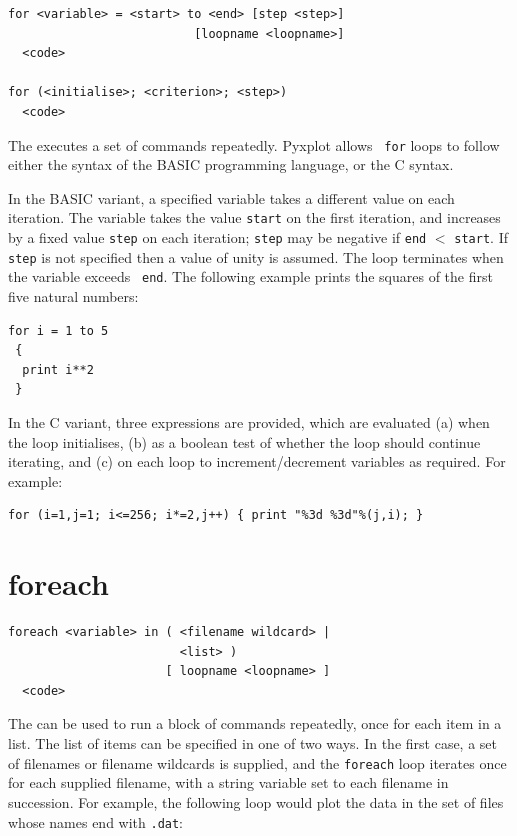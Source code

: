 \begin{verbatim}
for <variable> = <start> to <end> [step <step>]
                          [loopname <loopname>]
  <code>

for (<initialise>; <criterion>; <step>)
  <code>
\end{verbatim}

The  executes a set of commands repeatedly.  Pyxplot allows {\tt
for} loops to follow either the syntax of the BASIC programming language, or
the C syntax.

In the BASIC variant, a specified variable takes a different value on each
iteration. The variable takes the value {\tt start} on the first iteration, and
increases by a fixed value {\tt step} on each iteration; {\tt step} may be
negative if {\tt end} $<$ {\tt start}. If {\tt step} is not specified then a
value of unity is assumed. The loop terminates when the variable exceeds {\tt
end}.  The following example prints the squares of the first five natural
numbers:

\begin{verbatim}
for i = 1 to 5
 {
  print i**2
 }
\end{verbatim}

In the C variant, three expressions are provided, which are evaluated (a) when the loop initialises, (b) as a boolean test of whether the loop should
continue iterating, and (c) on each loop to increment/decrement variables as
required. For example:

\begin{verbatim}
for (i=1,j=1; i<=256; i*=2,j++) { print "%3d %3d"%(j,i); }
\end{verbatim}


\section{foreach}

\begin{verbatim}
foreach <variable> in ( <filename wildcard> |
                        <list> )
                      [ loopname <loopname> ]
  <code>
\end{verbatim}

The  can be used to run a block of commands repeatedly, once
for each item in a list.  The list of items can be specified in one of two
ways.  In the first case, a set of filenames or filename wildcards is supplied,
and the {\tt foreach} loop iterates once for each supplied filename, with a
string variable set to each filename in succession.  For example, the following
loop would plot the data in the set of files whose names end with {\tt .dat}:

